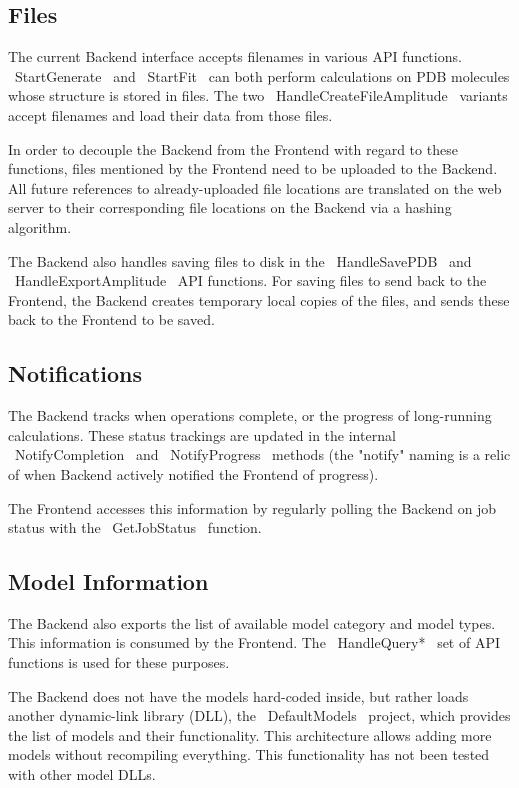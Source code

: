 \documentclass[12pt]{article}
\begin{document}
\subsection{Files}
The current Backend interface accepts filenames in various API functions. ~StartGenerate~ and ~StartFit~ can both perform calculations on PDB molecules whose structure is stored in files. The two ~HandleCreateFileAmplitude~ variants accept filenames and load their data from those files. 

In order to decouple the Backend from the Frontend with regard to these functions, files mentioned by the Frontend need to be uploaded to the Backend. All future references to already-uploaded file locations are translated on the web server to their corresponding file locations on the Backend via a hashing algorithm.

The Backend also handles saving files to disk in the ~HandleSavePDB~ and ~HandleExportAmplitude~ API functions. For saving files to send back to the Frontend, the Backend creates temporary local copies of the files, and sends these back to the Frontend to be saved.

\subsection{Notifications}
The Backend tracks when operations complete, or the progress of long-running calculations. These status trackings are updated in the internal ~NotifyCompletion~ and ~NotifyProgress~ methods (the "notify" naming is a relic of when Backend actively notified the Frontend of progress).

The Frontend accesses this information by regularly polling the Backend on job status with the ~GetJobStatus~ function.

\subsection{Model Information}
The Backend also exports the list of available model category and model types. This information is consumed by the Frontend. The ~HandleQuery*~ set of API functions is used for these purposes.

The Backend does not have the models hard-coded inside, but rather loads another dynamic-link library  (DLL), the ~DefaultModels~ project, which provides the list of models and their functionality. This architecture allows adding more models without recompiling everything. This functionality has not been tested with other model DLLs.
\end{document}
